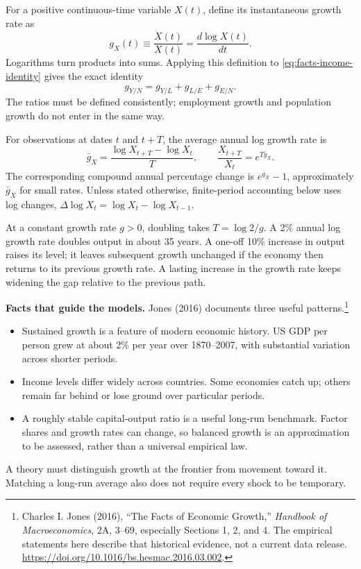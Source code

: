 For a positive continuous-time variable $X(t)$, define its instantaneous growth
rate as
\begin{equation}\label{eq:facts-growth-rate}
g_X(t)\equiv\frac{\dot X(t)}{X(t)}=\frac{d\log X(t)}{dt}.
\end{equation}
Logarithms turn products into sums. Applying this definition to
\eqref{eq:facts-income-identity} gives the exact identity
\begin{equation}\label{eq:facts-income-growth}
g_{Y/N}=g_{Y/L}+g_{L/E}+g_{E/N}.
\end{equation}
The ratios must be defined consistently; employment growth and population
growth do not enter in the same way.

For observations at dates $t$ and $t+T$, the average annual log growth rate is
\begin{equation}\label{eq:facts-average-growth}
\bar g_X=\frac{\log X_{t+T}-\log X_t}{T},
\qquad
\frac{X_{t+T}}{X_t}=e^{T\bar g_X}.
\end{equation}
The corresponding compound annual percentage change is $e^{\bar g_X}-1$,
approximately $\bar g_X$ for small rates. Unless stated otherwise, finite-period
accounting below uses log changes, $\Delta\log X_t=\log X_t-\log X_{t-1}$.

At a constant growth rate $g>0$, doubling takes $T=\log 2/g$. A 2\% annual
log growth rate doubles output in about 35 years. A one-off 10\% increase in
output raises its level; it leaves subsequent growth unchanged if the economy
then returns to its previous growth rate. A lasting increase in the growth
rate keeps widening the gap relative to the previous path.

\textbf{Facts that guide the models.}
Jones (2016) documents three useful patterns.\footnote{Charles I. Jones (2016),
``The Facts of Economic Growth,'' \textit{Handbook of Macroeconomics}, 2A,
3--69, especially Sections 1, 2, and 4. The empirical statements here describe
that historical evidence, not a current data release.
\url{https://doi.org/10.1016/bs.hesmac.2016.03.002}.}
\begin{itemize}
\tightlist
\item Sustained growth is a feature of modern economic history. US GDP per
person grew at about 2\% per year over 1870--2007, with substantial variation
across shorter periods.
\item Income levels differ widely across countries. Some economies catch up;
others remain far behind or lose ground over particular periods.
\item A roughly stable capital-output ratio is a useful long-run benchmark.
Factor shares and growth rates can change, so balanced growth is an
approximation to be assessed, rather than a universal empirical law.
\end{itemize}
A theory must distinguish growth at the frontier from movement toward it.
Matching a long-run average also does not require every shock to be temporary.

